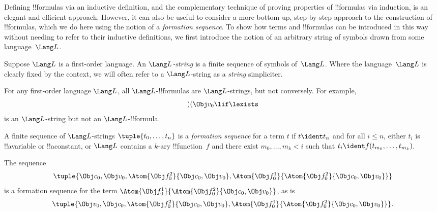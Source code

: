 \documentclass[../../../include/open-logic-section]{subfiles}
\begin{document}


Defining !!{formula}s via an inductive definition, and the
complementary technique of proving properties of !!{formula}s via
induction, is an elegant and efficient approach. However, it can
also be useful to consider a more bottom-up, step-by-step approach
to the construction of !!{formula}s, which we do here using the
notion of a \emph{formation sequence}.
%
To show how terms and !!{formula}s can be introduced in this way
without needing to refer to their inductive definitions, we first
introduce the notion of an arbitrary string of symbols drawn from
some language~$\Lang L$.

\begin{defn}[Strings]
Suppose $\Lang L$ is a first-order language. An \emph{$\Lang
L$-string} is a finite sequence of symbols of~$\Lang L$. Where the
language~$\Lang L$ is clearly fixed by the context, we will often
refer to a $\Lang L$-string as a \emph{string} simpliciter.
\end{defn}

\begin{ex}
For any first-order language $\Lang L$, all
$\Lang L$-!!{formula}s are $\Lang L$-strings, but not
conversely. For example, \[)(\Obj v_0\lif\lexists\] is an
$\Lang L$-string but not an $\Lang L$-!!{formula}.
\end{ex}

\begin{defn}
A finite sequence of $\Lang L$-strings $\tuple{t_0,\dotsc,t_n}$ is a
\emph{formation sequence} for a term $t$ if $t \ident t_n$ and for all
$i \leq n$, either $t_i$ is !!a{variable} or !!a{constant}, or $\Lang
L$ contains a $k$-ary !!{function}~$f$ and there exist
$m_0,\dotsc,m_k < i$ such that $t_i \ident f(t_{m_0},\dotsc,t_{m_k})$.
\end{defn}

\begin{ex}
The sequence
\[
    \tuple{\Obj c_0, \Obj v_0, \Atom{\Obj f^2_0}{\Obj c_0, \Obj v_0}, \Atom{\Obj f^1_0}{\Atom{\Obj f^2_0}{\Obj c_0, \Obj v_0}}}
\]
is a formation sequence for the term $\Atom{\Obj f^1_0}{\Atom{\Obj
f^2_0}{\Obj c_0, \Obj v_0}}$, as is
\[
    \tuple{\Obj v_0, \Obj c_0, \Atom{\Obj f^2_0}{\Obj c_0, \Obj v_0}, \Atom{\Obj f^1_0}{\Atom{\Obj f^2_0}{\Obj c_0, \Obj v_0}}}.
\]
\end{ex}
\end{document}
